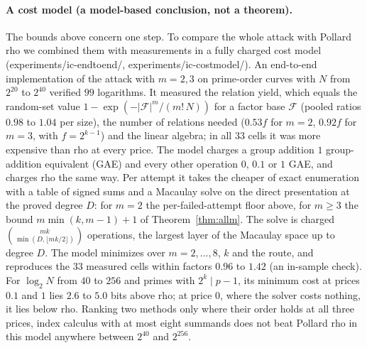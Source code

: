 \documentclass[11pt]{article}
\theoremstyle{definition}\newtheorem{definition}[theorem]{Definition}
\theoremstyle{remark}\newtheorem{remark}[theorem]{Remark}
\newcommand{\codeus}{\textunderscore\allowbreak}
\newcommand{\code}[1]{{\ttfamily\let\_\codeus#1}}
\begin{document}
\paragraph{A cost model (a model-based conclusion, not a theorem).} The
bounds above concern one step. To compare the whole attack with Pollard rho
we combined them with measurements in a fully charged cost model
(\code{experiments/ic-endtoend/}, \code{experiments/ic-costmodel/}). An
end-to-end implementation of the attack with $m=2,3$ on prime-order curves
with $N$ from $2^{20}$ to $2^{40}$ verified $99$ logarithms. It measured the
relation yield, which equals the random-set value
$1-\exp(-|\mathcal F|^m/(m!\,N))$ for a factor base $\mathcal F$ (pooled
ratios $0.98$ to $1.04$ per size), the number of relations needed ($0.53f$
for $m=2$, $0.92f$ for $m=3$, with $f=2^{k-1}$) and the linear algebra; in
all $33$ cells it was more expensive than rho at every price. The model
charges a group addition $1$ group-addition equivalent (GAE) and every other
operation $0$, $0.1$ or $1$ GAE, and charges rho the same way. Per attempt it takes the
cheaper of exact enumeration with a table of signed sums and a Macaulay solve
on the direct presentation at the proved degree $D$: for $m=2$ the
per-failed-attempt floor above, for $m\ge3$ the bound
$m\min(k,m-1)+1$ of Theorem~\ref{thm:allm}. The solve is charged
$\binom{mk}{\min(D,\lfloor mk/2\rfloor)}$ operations, the largest layer of
the Macaulay space up to degree $D$. The model minimizes over $m=2,\ldots,8$,
$k$ and the route, and reproduces the $33$ measured cells within factors
$0.96$ to $1.42$ (an in-sample check). For $\log_2N$ from $40$ to $256$ and
primes with $2^k\mid p-1$, its minimum cost at prices $0.1$ and $1$ lies
$2.6$ to $5.0$ bits above rho; at price $0$, where the solver costs
nothing, it lies below rho. Ranking two methods only where their order holds
at all three prices, index calculus with at most eight summands does not
beat Pollard rho in this model anywhere between $2^{40}$ and $2^{256}$.
\end{document}
